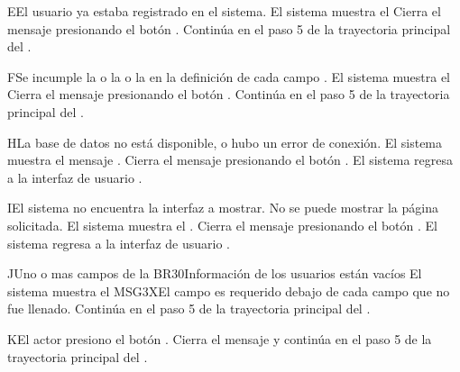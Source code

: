\begin{UCtrayectoriaA}{E}{El usuario ya estaba registrado en el sistema.}
	\UCpaso El sistema muestra el  
	\UCpaso[\UCactor] Cierra el mensaje presionando el botón .
	\UCpaso Continúa en el paso 5 de la trayectoria principal del .
\end{UCtrayectoriaA}

\begin{UCtrayectoriaA}{F}{Se incumple la  o la   o la   en la definición de cada campo   .}
	\UCpaso El sistema muestra el 
	\UCpaso[\UCactor] Cierra el mensaje presionando el botón .
	\UCpaso Continúa en el paso 5 de la trayectoria principal del .
\end{UCtrayectoriaA}



\begin{UCtrayectoriaA}{H}{La base de datos no está disponible, o hubo un error de conexión.}
	\UCpaso El sistema muestra el mensaje .
	\UCpaso[\UCactor] Cierra el mensaje presionando el botón .
	\UCpaso El sistema regresa a la interfaz de usuario .
\end{UCtrayectoriaA}

\begin{UCtrayectoriaA}{I}{El sistema no encuentra la interfaz a mostrar.}
	\UCpaso No se puede mostrar la página solicitada.
	\UCpaso El sistema muestra el .
	\UCpaso[\UCactor] Cierra el mensaje presionando el botón .
	\UCpaso El sistema regresa a la interfaz de usuario .
\end{UCtrayectoriaA}
\begin{UCtrayectoriaA}{J}{Uno o mas campos de la {BR30}{Información de los usuarios}  están vacíos }
	\UCpaso El sistema muestra el {MSG3X}{El campo es requerido} debajo de cada campo que no fue llenado. 
	\UCpaso	Continúa en el paso 5 de la trayectoria principal del .
\end{UCtrayectoriaA}
\begin{UCtrayectoriaA}{K}{El actor presiono el botón .}
	\UCpaso Cierra el mensaje y continúa en el paso 5 de la trayectoria principal del .	
\end{UCtrayectoriaA}
